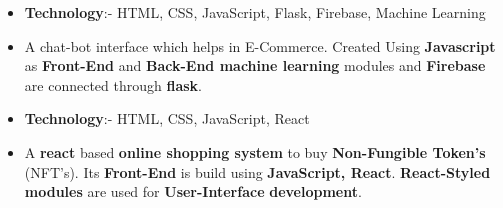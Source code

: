 

\begin{itemize}
    \item\textbf{Technology}:- HTML, CSS, JavaScript, Flask, Firebase, Machine Learning
    \item  A chat-bot interface which helps in E-Commerce. Created Using \textbf{Javascript} as \textbf{Front-End} and \textbf{Back-End machine learning} modules and \textbf{Firebase} are connected through \textbf{flask}.
\end{itemize}

\begin{itemize}
    \item\textbf{Technology}:- HTML, CSS, JavaScript, React
    \item A \textbf{react} based \textbf{online shopping system} to buy \textbf{Non-Fungible Token’s} (NFT’s). Its \textbf{Front-End} is build using \textbf{JavaScript, React}. \textbf{React-Styled modules} are used for \textbf{User-Interface} \textbf{development}.
\end{itemize}
